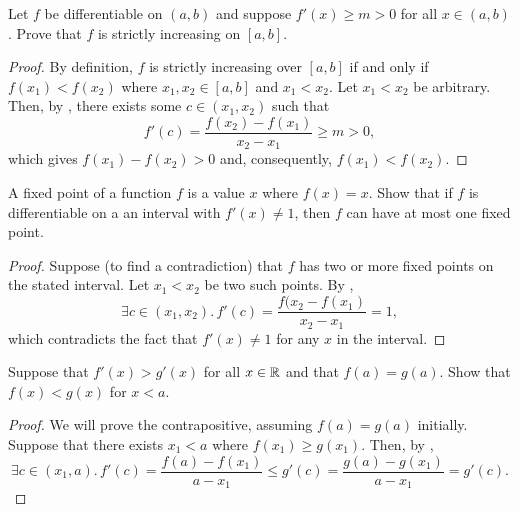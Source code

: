 \begin{problem}
  \label{prob:lower-bounded-deriv-strictly-increasing}
  Let $f$ be differentiable on $(a, b)$ and suppose $f'(x) \geq m > 0$ for all $x \in (a, b)$.
  Prove that $f$ is strictly increasing on $[a, b]$.

  \begin{proof}

    By definition, $f$ is strictly increasing over $[a, b]$ if and only if
    $f(x_{1}) < f(x_{2})$ where $x_{1}, x_{2} \in [a, b]$ and $x_{1} < x_{2}$.
    Let $x_{1} < x_{2}$ be arbitrary. Then, by ,
    there exists some $c \in (x_{1}, x_{2})$ such that
    \[
      f'(c) = \frac{f(x_{2}) - f(x_{1})}{x_{2} - x_{1}} \geq m > 0,
    \]
    which gives $f(x_{1}) - f(x_{2}) > 0$ and, consequently, $f(x_{1}) < f(x_{2})$. 
  \end{proof}
\end{problem}

\begin{problem}
  A fixed point of a function $f$ is a value $x$ where $f(x) = x$. Show that if
  $f$ is differentiable on a an interval with $f'(x) \neq 1$, then $f$ can have
  at most one fixed point.

  \begin{proof}
    Suppose (to find a contradiction) that $f$ has two or more fixed points on the stated interval.
    Let $x_{1} < x_{2}$ be two such points. By ,
    \[
      \exists c \in (x_{1}, x_{2}).\, f'(c) = \frac{f(x_{2} - f(x_{1})}{x_{2} - x_{1}} = 1,
    \]
    which contradicts the fact that $f'(x) \neq 1$ for any $x$ in the interval.
  \end{proof}
\end{problem}

\begin{problem}
  Suppose that $f'(x) > g'(x)$ for all $x \in \mathbb{R}$ and that $f(a) = g(a)$.
  Show that $f(x) < g(x)$ for $x < a$.

  \begin{proof}
    We will prove the contrapositive, assuming $f(a) = g(a)$ initially. Suppose
    that there exists $x_{1} < a$ where $f(x_{1}) \geq g(x_{1})$. Then, by
    ,
    \[
      \exists c \in (x_{1}, a).\, f'(c) = \frac{f(a) - f(x_{1})}{a - x_{1}} \leq g'(c) = \frac{g(a) - g(x_{1})}{a - x_{1}} = g'(c).
    \]
  \end{proof}
\end{problem}

